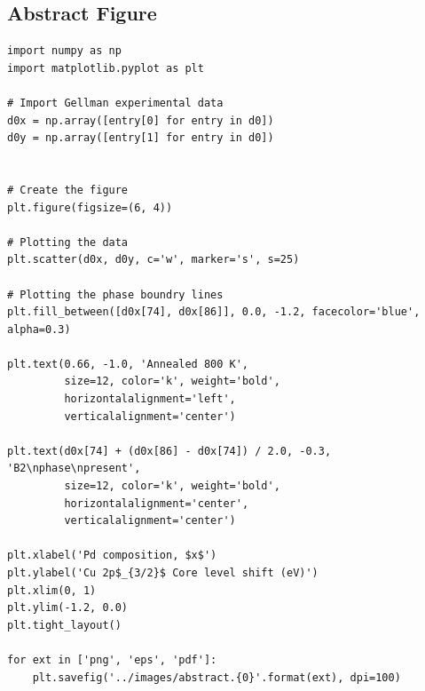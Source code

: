 \documentclass[number, sort&compress, review, 12pt]{elsarticle}
\begin{document}
\subsection{Abstract Figure}
\label{sec-10-7}

\begin{verbatim}
import numpy as np
import matplotlib.pyplot as plt

# Import Gellman experimental data
d0x = np.array([entry[0] for entry in d0])
d0y = np.array([entry[1] for entry in d0])


# Create the figure
plt.figure(figsize=(6, 4))

# Plotting the data
plt.scatter(d0x, d0y, c='w', marker='s', s=25)

# Plotting the phase boundry lines
plt.fill_between([d0x[74], d0x[86]], 0.0, -1.2, facecolor='blue', alpha=0.3)

plt.text(0.66, -1.0, 'Annealed 800 K',
         size=12, color='k', weight='bold',
         horizontalalignment='left',
         verticalalignment='center')

plt.text(d0x[74] + (d0x[86] - d0x[74]) / 2.0, -0.3, 'B2\nphase\npresent',
         size=12, color='k', weight='bold',
         horizontalalignment='center',
         verticalalignment='center')

plt.xlabel('Pd composition, $x$')
plt.ylabel('Cu 2p$_{3/2}$ Core level shift (eV)')
plt.xlim(0, 1)
plt.ylim(-1.2, 0.0)
plt.tight_layout()

for ext in ['png', 'eps', 'pdf']:
    plt.savefig('../images/abstract.{0}'.format(ext), dpi=100)
\end{verbatim}
\end{document}
